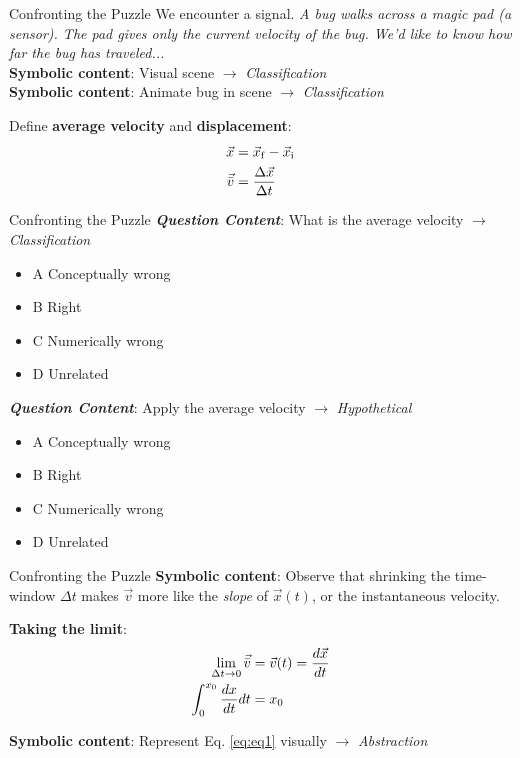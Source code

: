 \documentclass{beamer}
\begin{document}
\begin{frame}{Confronting the Puzzle}
We encounter a \alert{signal}.  \textit{A bug walks across a magic pad (a sensor).  The pad gives only the current velocity of the bug.  We'd like to know how far the bug has traveled...} \\ 
\alert{\textbf{Symbolic content}}: Visual scene $\to$ \textit{\alert{Classification}} \\
\alert{\textbf{Symbolic content}}: Animate bug in scene $\to$ \textit{\alert{Classification}} \vspace{0.25cm}
\begin{tcolorbox}
Define \textbf{average velocity} and \textbf{displacement}: \\
\begin{align}
\vec{x} &= \vec{x}_{\rm f} - \vec{x}_{\rm i} \\
\vec{\bar{v}} &= \frac{\Delta \vec{x}}{\Delta t}
\end{align}
\end{tcolorbox}
\end{frame}

\begin{frame}{Confronting the Puzzle}
\small
\textbf{\textit{Question Content}}: What is the average velocity $\to$ \textit{\alert{Classification}}
\begin{itemize}
\item A Conceptually wrong
\item B Right
\item C Numerically wrong
\item D Unrelated
\end{itemize}
\textbf{\textit{Question Content}}: Apply the average velocity $\to$ \textit{\alert{Hypothetical}}
\begin{itemize}
\item A Conceptually wrong
\item B Right
\item C Numerically wrong
\item D Unrelated
\end{itemize}
\end{frame}

\begin{frame}{Confronting the Puzzle}
\alert{\textbf{Symbolic content}}: Observe that shrinking the time-window $\Delta t$ makes $\vec{v}$ more like the \textit{slope} of $\vec{x}(t)$, or the instantaneous velocity. \\ \vspace{0.5cm}
\begin{tcolorbox}
\textbf{Taking the limit}:
\begin{align} 
\lim_{\Delta t \to 0} \vec{\bar{v}} &= \vec{v}(t) = \frac{d\vec{x}}{dt} \\
\int_{0}^{x_{\rm 0}} \frac{dx}{dt} dt &= x_{\rm 0} \label{eq:eq1}
\end{align}
\end{tcolorbox}
\vspace{0.5cm}
\alert{\textbf{Symbolic content}}: Represent Eq. \ref{eq:eq1} visually $\to$ \textit{\alert{Abstraction}}
\end{frame}
\end{document}
